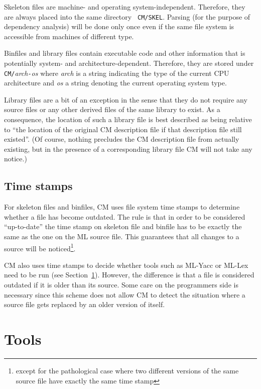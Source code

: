 \documentclass{article}
\begin{document}
Skeleton files are machine- and operating system-independent.
Therefore, they are always placed into the same directory {\tt
CM/SKEL}. Parsing (for the purpose of dependency analysis) will be
done only once even if the same file system is accessible from
machines of different type.

Binfiles and library files contain executable code and other
information that is potentially system- and architecture-dependent.
Therefore, they are stored under {\tt CM/}{\it arch}{\tt -}{\it os}
where {\it arch} is a string indicating the type of the current
CPU architecture and {\it os} a string denoting the current operating
system type.

Library files are a bit of an exception in the sense that they do not
require any source files or any other derived files of the same
library to exist.  As a consequence, the location of such a library
file is best described as being relative to ``the location of the
original CM description file if that description file still existed''.
(Of course, nothing precludes the CM description file from actually
existing, but in the presence of a corresponding library file CM will
not take any notice.)

\subsection{Time stamps}

For skeleton files and binfiles, CM uses file system time stamps to
determine whether a file has become outdated.  The rule is that in
order to be considered ``up-to-date'' the time stamp on skeleton file
and binfile has to be exactly the same as the one on the ML source
file.  This guarantees that all changes to a source will be
noticed\footnote{except for the pathological case where two different
versions of the same source file have exactly the same time stamp}.

CM also uses time stamps to decide whether tools such as ML-Yacc or
ML-Lex need to be run (see Section~\ref{sec:tools}).  However, the
difference is that a file is considered outdated if it is older than
its source.  Some care on the programmers side is necessary since this
scheme does not allow CM to detect the situation where a source file
gets replaced by an older version of itself.

\section{Tools}
\label{sec:tools}
\end{document}
